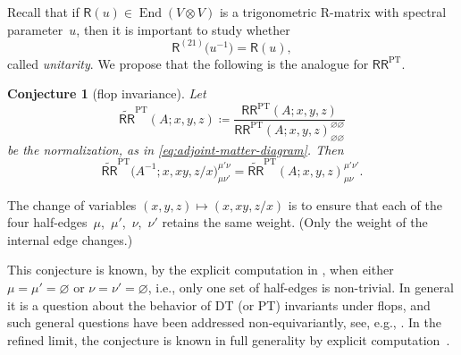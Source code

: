 \documentclass[pdftex]{sigma}%
\numberwithin{equation}{section}
\newtheorem{Conjecture}[Theorem]{Conjecture}
 { \theoremstyle{definition}
\newtheorem{Definition}[Theorem]{Definition}
\newtheorem{Example}[Theorem]{Example}
\newtheorem{Remark}[Theorem]{Remark}
\newtheorem{MyParagraph}{}[subsection]
}
\renewcommand{\tilde}[1]{\widetilde{#1}}
\newcommand{\sR}{\mathsf{R}}
\newcommand{\sRR}{\mathsf{RR}}
\DeclareMathOperator{\End}{End}
\DeclareMathOperator{\PT}{PT}
\begin{document}
\begin{MyParagraph}\label{sec:RR-matrix-unitary}
Recall that if $\sR(u) \in \End(V \otimes V)$ is a trigonometric
R-matrix with spectral parameter~$u$, then it is important to study
whether
\[ \sR^{(21)}\big(u^{-1}\big) = \sR(u), \]
called {\it unitarity}. We propose that the following is the analogue
for $\sRR^{\PT}$.

\begin{Conjecture}[flop invariance]
 Let
 \[ \tilde\sRR^{\PT}(A; x,y,z) \coloneqq \frac{\sRR^{\PT}(A; x,y,z)}{\sRR^{\PT}(A; x,y,z)^{\varnothing\varnothing}_{\varnothing\varnothing}} \]
 be the normalization, as in \eqref{eq:adjoint-matter-diagram}. Then
 \[ \tilde\sRR^{\PT}\big(A^{-1}; x, xy, z/x\big)^{\mu'\nu}_{\mu\nu'} = \tilde\sRR^{\PT}(A; x,y,z)^{\mu'\nu'}_{\mu\nu}. \]
\end{Conjecture}

The change of variables $(x,y,z) \mapsto (x, xy, z/x)$ is to ensure
that each of the four half-edges~$\mu$,~$\mu'$,~$\nu$,~$\nu'$ retains the
same weight. (Only the weight of the internal edge changes.)

This conjecture is known, by the explicit computation in
\cite{Kononov2021}, when either $\mu = \mu' = \varnothing$ or $\nu =
\nu' = \varnothing$, i.e., only one set of half-edges is non-trivial. In
general it is a question about the behavior of DT (or PT) invariants
under flops, and such general questions have been addressed
non-equivariantly, see, e.g., \cite{Calabrese2016}. In the refined
limit, the conjecture is known in full generality by explicit
computation~\cite{Awata2009}.
\end{MyParagraph}
\end{document}
